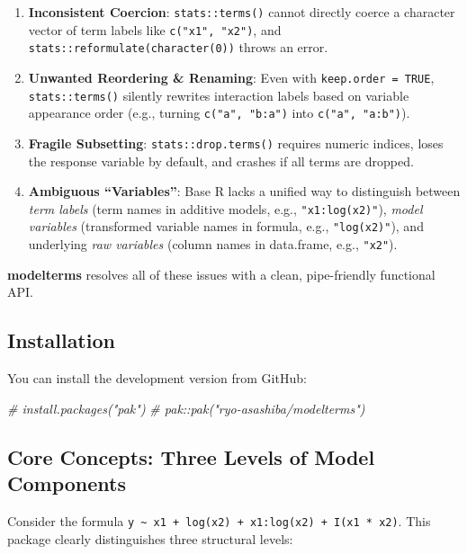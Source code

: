 \documentclass[
]{article}
\newenvironment{Shaded}{\begin{snugshade}}{\end{snugshade}}
\newcommand{\CommentTok}[1]{\textcolor[rgb]{0.56,0.35,0.01}{\textit{#1}}}
\providecommand{\tightlist}{%
  \setlength{\itemsep}{0pt}\setlength{\parskip}{0pt}}
\begin{document}
\begin{enumerate}
\def\labelenumi{\arabic{enumi}.}
\tightlist
\item
  \textbf{Inconsistent Coercion}: \texttt{stats::terms()} cannot
  directly coerce a character vector of term labels like
  \texttt{c("x1",\ "x2")}, and \texttt{stats::reformulate(character(0))}
  throws an error.
\item
  \textbf{Unwanted Reordering \& Renaming}: Even with
  \texttt{keep.order\ =\ TRUE}, \texttt{stats::terms()} silently
  rewrites interaction labels based on variable appearance order (e.g.,
  turning \texttt{c("a",\ "b:a")} into \texttt{c("a",\ "a:b")}).
\item
  \textbf{Fragile Subsetting}: \texttt{stats::drop.terms()} requires
  numeric indices, loses the response variable by default, and crashes
  if all terms are dropped.
\item
  \textbf{Ambiguous ``Variables''}: Base R lacks a unified way to
  distinguish between \emph{term labels} (term names in additive models,
  e.g., \texttt{"x1:log(x2)"}), \emph{model variables} (transformed
  variable names in formula, e.g., \texttt{"log(x2)"}), and underlying
  \emph{raw variables} (column names in data.frame, e.g.,
  \texttt{"x2"}).
\end{enumerate}

\textbf{modelterms} resolves all of these issues with a clean,
pipe-friendly functional API.

\subsection{Installation}\label{installation}

You can install the development version from GitHub:

\begin{Shaded}
\begin{Highlighting}[]
\CommentTok{\# install.packages("pak")}
\CommentTok{\# pak::pak("ryo{-}asashiba/modelterms")}
\end{Highlighting}
\end{Shaded}

\subsection{Core Concepts: Three Levels of Model
Components}\label{core-concepts-three-levels-of-model-components}

Consider the formula
\texttt{y\ \textasciitilde{}\ x1\ +\ log(x2)\ +\ x1:log(x2)\ +\ I(x1\ *\ x2)}.
This package clearly distinguishes three structural levels:
\end{document}
